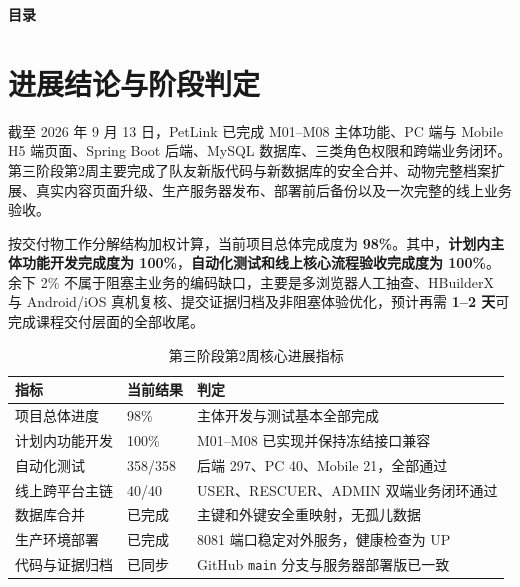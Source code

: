 \documentclass[UTF8,a4paper,zihao=-4,fontset=mac]{ctexart}
\newcommand{\code}[1]{\texttt{\small #1}}
\begin{document}
\pagestyle{empty}
\thispagestyle{empty}
\begin{center}
  {\bfseries\color{PetGreen}目\quad 录}
\end{center}
\vspace{0.8cm}
\makeatletter{}\makeatother
\clearpage

\setcounter{page}{1}
\pagestyle{fancy}

\section{进展结论与阶段判定}

截至 2026 年 9 月 13 日，PetLink 已完成 M01--M08 主体功能、PC 端与 Mobile H5 端页面、Spring Boot 后端、MySQL 数据库、三类角色权限和跨端业务闭环。第三阶段第2周主要完成了队友新版代码与新数据库的安全合并、动物完整档案扩展、真实内容页面升级、生产服务器发布、部署前后备份以及一次完整的线上业务验收。

按交付物工作分解结构加权计算，当前项目总体完成度为 \textbf{98\%}。其中，\textbf{计划内主体功能开发完成度为 100\%}，\textbf{自动化测试和线上核心流程验收完成度为 100\%}。余下 2\% 不属于阻塞主业务的编码缺口，主要是多浏览器人工抽查、HBuilderX 与 Android/iOS 真机复核、提交证据归档及非阻塞体验优化，预计再需 \textbf{1--2 天}可完成课程交付层面的全部收尾。

\begin{table}[H]
\centering
\caption{第三阶段第2周核心进展指标}
\label{tab:headline}
\begin{tabularx}{\textwidth}{L{4.0cm}C{3.0cm}Y}
\toprule
{}\color{white}\bfseries 指标 & \color{white}\bfseries 当前结果 & \color{white}\bfseries 判定 \\
\midrule
项目总体进度 & 98\% & 主体开发与测试基本全部完成 \\
计划内功能开发 & 100\% & M01--M08 已实现并保持冻结接口兼容 \\
自动化测试 & 358/358 & 后端 297、PC 40、Mobile 21，全部通过 \\
线上跨平台主链 & 40/40 & USER、RESCUER、ADMIN 双端业务闭环通过 \\
数据库合并 & 已完成 & 主键和外键安全重映射，无孤儿数据 \\
生产环境部署 & 已完成 & 8081 端口稳定对外服务，健康检查为 UP \\
代码与证据归档 & 已同步 & GitHub \code{main} 分支与服务器部署版已一致 \\
\bottomrule
\end{tabularx}
\end{table}
\end{document}
